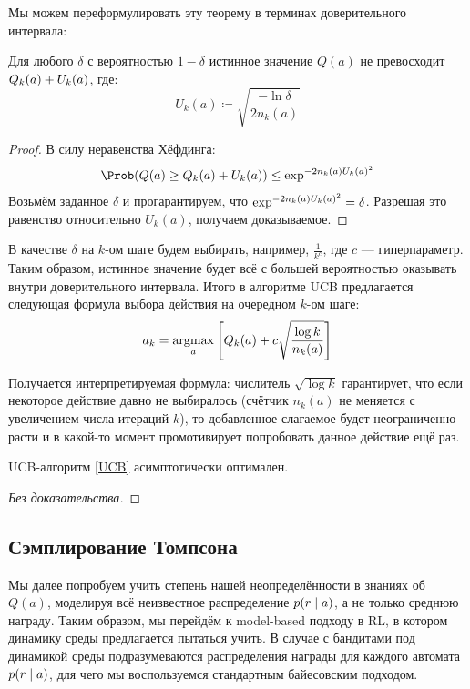 Мы можем переформулировать эту теорему в терминах доверительного интервала:

\begin{proposition}
Для любого $\delta$ с вероятностью $1 - \delta$ истинное значение $Q(a)$ не превосходит $Q_k(a) \HM+ U_k(a)$, где:
$$U_k(a) \coloneqq \sqrt{\frac{-\ln \delta}{2n_k(a)}}$$
\begin{proof}
В силу неравенства Хёфдинга:
$$\Prob (Q(a) \ge Q_k(a) + U_k(a)) \le \exp^{-2 n_k(a) U_k(a)^2}$$
Возьмём заданное $\delta$ и прогарантируем, что $\exp^{-2 n_k(a) U_k(a)^2} \HM= \delta$. Разрешая это равенство относительно $U_k(a)$, получаем доказываемое.
\end{proof}
\end{proposition}

В качестве $\delta$ на $k$-ом шаге будем выбирать, например, $\frac{1}{k^c}$, где $c$ --- гиперпараметр. Таким образом, истинное значение будет всё с большей вероятностью оказывать внутри доверительного интервала. Итого в алгоритме UCB предлагается следующая формула выбора действия на очередном $k$-ом шаге:
\begin{equation}\label{UCB}
a_k = \mathop{\mathrm{argmax}}_a \left[ Q_k(a) + c \sqrt{\frac{\log k}{n_k(a)}} \right]
\end{equation}

Получается интерпретируемая формула: числитель $\sqrt{\log k}$ гарантирует, что если некоторое действие давно не выбиралось (счётчик $n_k(a)$ не меняется с увеличением числа итераций $k$), то добавленное слагаемое будет неограниченно расти и в какой-то момент промотивирует попробовать данное действие ещё раз.

\begin{theorem}
UCB-алгоритм \eqref{UCB} асимптотически оптимален.
\begin{proof}[Без доказательства]\end{proof}
\end{theorem}

\subsection{Сэмплирование Томпсона}

Мы далее попробуем учить степень нашей неопределённости в знаниях об $Q(a)$, моделируя всё неизвестное распределение $p(r \HM\mid a)$, а не только среднюю награду. Таким образом, мы перейдём к model-based подходу в RL, в котором динамику среды предлагается пытаться учить. В случае с бандитами под динамикой среды подразумеваются распределения награды для каждого автомата $p(r \HM\mid a)$, для чего мы воспользуемся стандартным байесовским подходом.

